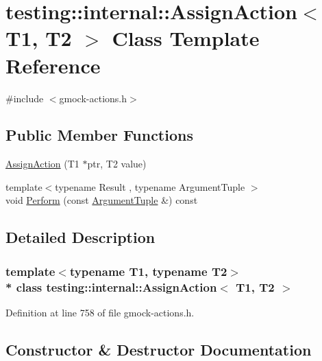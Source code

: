\hypertarget{classtesting_1_1internal_1_1_assign_action}{}\section{testing\+:\+:internal\+:\+:Assign\+Action$<$ T1, T2 $>$ Class Template Reference}
\label{classtesting_1_1internal_1_1_assign_action}


{\ttfamily \#include $<$gmock-\/actions.\+h$>$}

\subsection*{Public Member Functions}
\begin{DoxyCompactItemize}
\item 
\hyperlink{classtesting_1_1internal_1_1_assign_action_ae5a8fe8954ff3f8b26a08b57c3afdf9a}{Assign\+Action} (T1 $\ast$ptr, T2 value)
\item 
{\footnotesize template$<$typename Result , typename Argument\+Tuple $>$ }\\void \hyperlink{classtesting_1_1internal_1_1_assign_action_affbedc9143889ce5ce2cc099a8d69226}{Perform} (const \hyperlink{typedefs__d_8js_a396b2bdc7ef45f482a7e9254b15c3c01}{Argument\+Tuple} \&) const 
\end{DoxyCompactItemize}


\subsection{Detailed Description}
\subsubsection*{template$<$typename T1, typename T2$>$\\*
class testing\+::internal\+::\+Assign\+Action$<$ T1, T2 $>$}



Definition at line 758 of file gmock-\/actions.\+h.



\subsection{Constructor \& Destructor Documentation}
